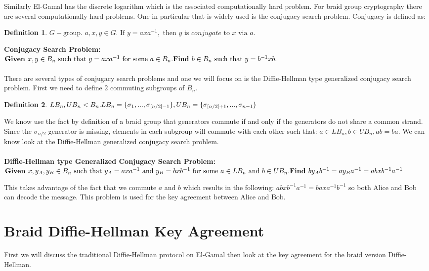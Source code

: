 \documentclass{article}
\theoremstyle{definition}
\newtheorem{definition}{Definition}[section]
\begin{document}
Similarly El-Gamal has the discrete logarithm which is the associated computationally hard problem. 
For braid group cryptography there are several computationally hard problems. One in particular that is widely used is the conjugacy search problem. Conjugacy is defined as:
\begin{definition} 
$G-\text{group. } a,x,y \in G. \text{ If }y=axa^{-1},\text{ then }y \text{ is } conjugate \text{ to }x \text{ via }a.$
\end{definition}

\noindent \textbf{Conjugacy Search Problem:} \\ $\textbf{Given }x,y \in B_n \text{ such that }y=axa^{-1} \text{ for some }a \in B_n. \\ \textbf{Find }b \in B_n \text{ such that }y=b^{-1}xb.$
\\ \\
There are several types of conjugacy search problems and one we will focus on is the Diffie-Hellman type generalized conjugacy search problem. First we need to define $2$ commuting subgroups of $B_n$. 


\begin{definition}
$LB_n,UB_n < B_n. \\ LB_n=\{ \sigma_1,...,\sigma_{[n/2]-1}  \}, UB_n=\{ \sigma_{[n/2]+1},...,\sigma_{n-1}  \} $
\end{definition}

We know use the fact by definition of a braid group that generators commute if and only if the generators do not share a common strand. Since the $\sigma_{n/2}$ generator is missing, elements in each subgroup will commute with each other such that: $a \in LB_n, b \in UB_n, ab=ba$. We can know look at the Diffie-Hellman generalized conjugacy search problem.
\\ \\
\textbf{Diffie-Hellman type Generalized Conjugacy Search Problem:} \\ $\textbf{Given }x,y_A, y_B \in B_n \text{ such that }y_A=axa^{-1} \text{ and } y_B=bxb^{-1} \text{ for some }a \in LB_n \text{ and }b \in UB_n. \\ \textbf{Find }by_Ab^{-1}=ay_Ba^{-1}=abxb^{-1}a^{-1}$

This takes advantage of the fact that we commute $a$ and $b$ which results in the following: $abxb^{-1}a^{-1}=baxa^{-1}b^{-1}$ so both Alice and Bob can decode the message. This problem is used for the key agreement between Alice and Bob.

\section{Braid Diffie-Hellman Key Agreement}
First we will discuss the traditional Diffie-Hellman protocol on El-Gamal then look at the key agreement for the braid version Diffie-Hellman. 
\end{document}

